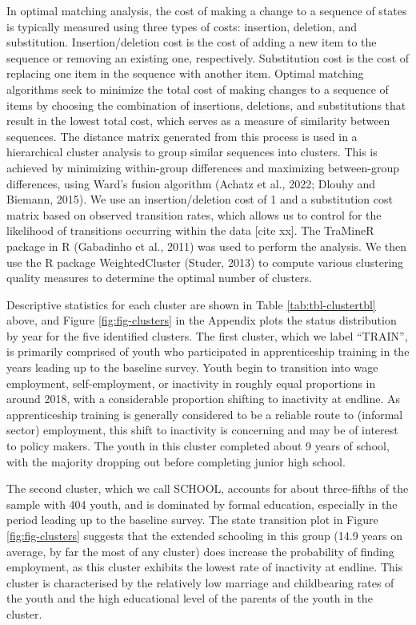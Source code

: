 \documentclass[
  11pt,
a4paper
]{article}
\begin{document}
In optimal matching analysis, the cost of making a change to a sequence of states is typically measured using three types of costs: insertion, deletion, and substitution. Insertion/deletion cost is the cost of adding a new item to the sequence or removing an existing one, respectively. Substitution cost is the cost of replacing one item in the sequence with another item. Optimal matching algorithms seek to minimize the total cost of making changes to a sequence of items by choosing the combination of insertions, deletions, and substitutions that result in the lowest total cost, which serves as a measure of similarity between sequences. The distance matrix generated from this process is used in a hierarchical cluster analysis to group similar sequences into clusters. This is achieved by minimizing within-group differences and maximizing between-group differences, using Ward's fusion algorithm (Achatz et al., 2022; Dlouhy and Biemann, 2015). We use an insertion/deletion cost of 1 and a substitution cost matrix based on observed transition rates, which allows us to control for the likelihood of transitions occurring within the data {[}cite xx{]}. The TraMineR package in R (Gabadinho et al., 2011) was used to perform the analysis. We then use the R package WeightedCluster (Studer, 2013) to compute various clustering quality measures to determine the optimal number of clusters.

Descriptive statistics for each cluster are shown in Table \ref{tab:tbl-clustertbl} above, and Figure \ref{fig:fig-clusters} in the Appendix plots the status distribution by year for the five identified clusters. The first cluster, which we label ``TRAIN'', is primarily comprised of youth who participated in apprenticeship training in the years leading up to the baseline survey. Youth begin to transition into wage employment, self-employment, or inactivity in roughly equal proportions in around 2018, with a considerable proportion shifting to inactivity at endline. As apprenticeship training is generally considered to be a reliable route to (informal sector) employment, this shift to inactivity is concerning and may be of interest to policy makers. The youth in this cluster completed about 9 years of school, with the majority dropping out before completing junior high school.

The second cluster, which we call SCHOOL, accounts for about three-fifths of the sample with 404 youth, and is dominated by formal education, especially in the period leading up to the baseline survey. The state transition plot in Figure \ref{fig:fig-clusters} suggests that the extended schooling in this group (14.9 years on average, by far the most of any cluster) does increase the probability of finding employment, as this cluster exhibits the lowest rate of inactivity at endline. This cluster is characterised by the relatively low marriage and childbearing rates of the youth and the high educational level of the parents of the youth in the cluster.
\end{document}

